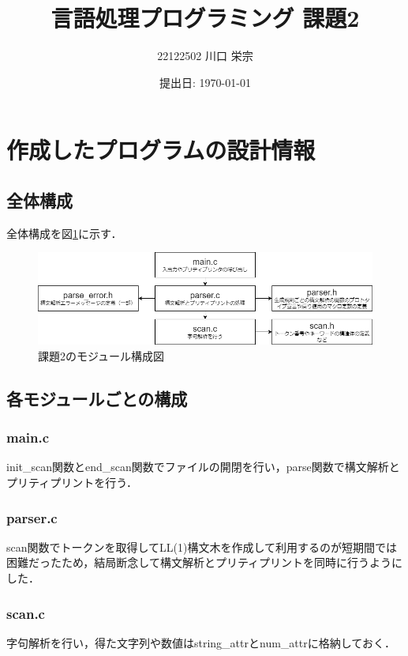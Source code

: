 \documentclass{jlreq}
\title{言語処理プログラミング 課題2}
\author{22122502 川口 栄宗}
\date{提出日: \today}
\begin{document}
\maketitle
\clearpage

\section{作成したプログラムの設計情報}

\subsection{全体構成}

全体構成を図\ref{fig:module_graph}に示す．
\begin{figure}[H]
  \centering
  \includegraphics[width=\textwidth]{assets/module_02.png}
  \caption{課題2のモジュール構成図}
  \label{fig:module_graph}
\end{figure}

\subsection{各モジュールごとの構成}

\subsubsection{main.c}
init\_scan関数とend\_scan関数でファイルの開閉を行い，parse関数で構文解析とプリティプリントを行う．

\subsubsection{parser.c}
scan関数でトークンを取得してLL(1)構文木を作成して利用するのが短期間では困難だったため，結局断念して構文解析とプリティプリントを同時に行うようにした．

\subsubsection{scan.c}
字句解析を行い，得た文字列や数値はstring\_attrとnum\_attrに格納しておく．
\end{document}
